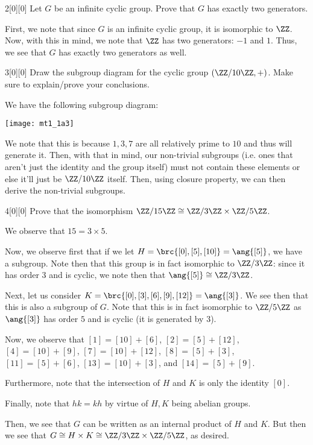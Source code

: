 \documentclass{article}
\begin{document}
\begin{hw}{2}[0][0]
	Let $G$ be an infinite cyclic group. Prove that $G$ has exactly two generators.
\end{hw}
\begin{solution}
	First, we note that since $G$ is an infinite cyclic group, it is isomorphic to $\ZZ$. Now, with this in mind, we note that $\ZZ$ has two generators: $-1$ and $1$. Thus, we see that $G$ has exactly two generators as well.
\end{solution}

\begin{hw}{3}[0][0]
	Draw the subgroup diagram for the cyclic group $(\ZZ/10\ZZ, +)$. Make sure to explain/prove your conclusions.
\end{hw}
\begin{solution}
	We have the following subgroup diagram:
	

	\begin{center}
			\texttt{[image: mt1\_1a3]}
		\end{center}
	
	We note that this is because $1, 3, 7$ are all relatively prime to $10$ and thus will generate it. Then, with that in mind, our non-trivial subgroups (i.e. ones that aren't just the identity and the group itself) must not contain these elements or else it'll just be $\ZZ/10\ZZ$ itself. Then, using closure property, we can then derive the non-trivial subgroups.
\end{solution}

\begin{hw}{4}[0][0]
	Prove that the isomorphism $\ZZ/15\ZZ \cong \ZZ/3\ZZ \times \ZZ/5\ZZ$.
\end{hw}
\begin{solution}
	We observe that $15 = 3 \times 5$.
	
	Now, we observe first that if we let $H = \brc{[0], [5], [10]} = \ang{[5]}$, we have a subgroup. Note then that this group is in fact isomorphic to $\ZZ/3\ZZ$: since it has order 3 and is cyclic, we note then that $\ang{[5]} \cong \ZZ/3\ZZ$.
	
	Next, let us consider $K = \brc{[0], [3], [6], [9], [12]} = \ang{[3]}$. We see then that this is also a subgroup of $G$. Note that this is in fact isomorphic to $\ZZ/5\ZZ$ as $\ang{[3]}$ has order $5$ and is cyclic (it is generated by $3$).
	
	Now, we observe that $[1] = [10] + [6]$, $[2] = [5] + [12]$, $[4] = [10] + [9]$, $[7] = [10] + [12]$, $[8] = [5] + [3]$, $[11] = [5] + [6]$, $[13] = [10] + [3]$, and $[14] = [5] + [9]$. 
	
	Furthermore, note that the intersection of $H$ and $K$ is only the identity $[0]$.
	
	Finally, note that $hk = kh$ by virtue of $H, K$ being abelian groups.
	
	Then, we see that $G$ can be written as an internal product of $H$ and $K$. But then we see that $G \cong H \times K \cong \ZZ/3\ZZ \times \ZZ/5\ZZ$, as desired.
\end{solution}
\end{document}

